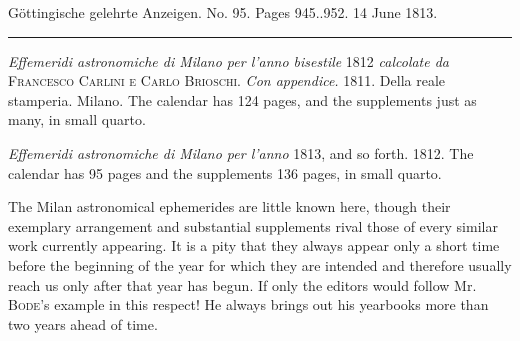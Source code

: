 \clearpage
{}
\begin{center}\small Göttingische gelehrte Anzeigen. No. 95. Pages 945..952. 14 June 1813.\\[3pt]\rule{.72\linewidth}{.3pt}\end{center}

\emph{Effemeridi astronomiche di Milano per l'anno bisestile} 1812 \emph{calcolate da} \textsc{Francesco Carlini e Carlo Brioschi}. \emph{Con appendice.} 1811. Della reale stamperia. Milano. The calendar has 124 pages, and the supplements just as many, in small quarto.

\emph{Effemeridi astronomiche di Milano per l'anno} 1813, and so forth. 1812. The calendar has 95 pages and the supplements 136 pages, in small quarto.

The Milan astronomical ephemerides are little known here, though their exemplary arrangement and substantial supplements rival those of every similar work currently appearing. It is a pity that they always appear only a short time before the beginning of the year for which they are intended and therefore usually reach us only after that year has begun. If only the editors would follow Mr. \textsc{Bode}'s example in this respect! He always brings out his yearbooks more than two years ahead of time.

